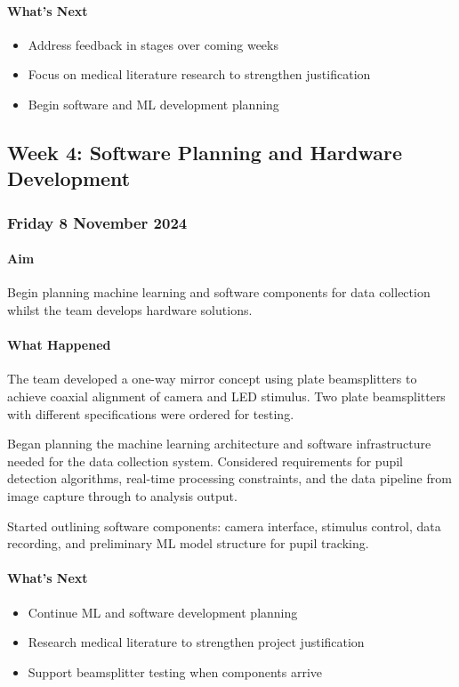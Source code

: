 \paragraph{What's Next}
\begin{itemize}
    \item Address feedback in stages over coming weeks
    \item Focus on medical literature research to strengthen justification
    \item Begin software and ML development planning
\end{itemize}

\subsection{Week 4: Software Planning and Hardware Development}

\subsubsection*{Friday 8 November 2024}

\paragraph{Aim}
Begin planning machine learning and software components for data collection whilst the team develops hardware solutions.

\paragraph{What Happened}
The team developed a one-way mirror concept using plate beamsplitters to achieve coaxial alignment of camera and LED stimulus. Two plate beamsplitters with different specifications were ordered for testing.

Began planning the machine learning architecture and software infrastructure needed for the data collection system. Considered requirements for pupil detection algorithms, real-time processing constraints, and the data pipeline from image capture through to analysis output.

Started outlining software components: camera interface, stimulus control, data recording, and preliminary ML model structure for pupil tracking.

\paragraph{What's Next}
\begin{itemize}
    \item Continue ML and software development planning
    \item Research medical literature to strengthen project justification
    \item Support beamsplitter testing when components arrive
\end{itemize}

